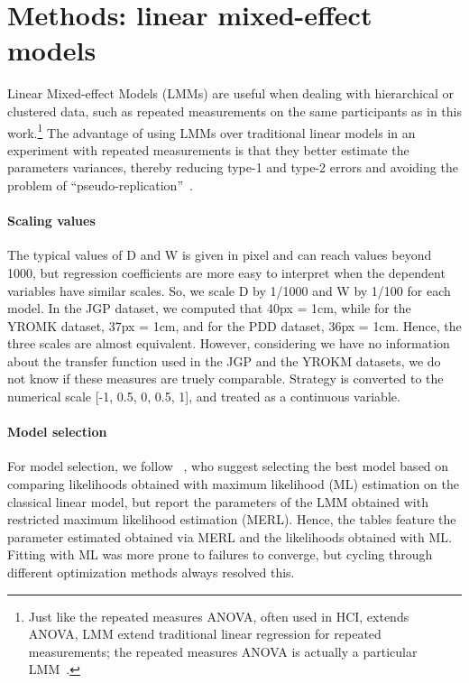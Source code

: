 \documentclass[acmlarge, manuscript,review]{acmart}
\begin{document}
\section{Methods: linear mixed-effect models\label{app:lmm}}
Linear Mixed-effect Models (LMMs) are useful when dealing with hierarchical or clustered data, such as repeated measurements on the same participants as in this work\cite{harrison2018}.\footnote{Just like the repeated measures ANOVA, often used in HCI, extends ANOVA, LMM extend traditional linear regression for repeated measurements; the repeated measures ANOVA is actually a particular LMM~\cite{murrar2018}.}
The advantage of using LMMs over traditional linear models in an experiment with repeated measurements is that they better estimate the parameters variances, thereby reducing type-1 and type-2 errors and avoiding the problem of ``pseudo-replication''~\cite{harrison2018}. 


\paragraph{Scaling values}
The typical values of D and W is given in pixel and can reach values beyond 1000, but regression coefficients are more easy to interpret when the dependent variables have similar scales. So, we scale D by 1/1000 and W by 1/100 for each model. In the JGP dataset, we computed that 40px = 1cm, while for the YROMK dataset, 37px = 1cm, and for the PDD dataset, 36px = 1cm. Hence, the three scales are almost equivalent. However, considering we have no information about the transfer function used in the JGP and the YROKM datasets, we do not know if these measures are truely comparable.
Strategy is converted to the numerical scale [-1, 0.5, 0, 0.5, 1], and treated as a continuous variable. 

\paragraph{Model selection}
For model selection, we follow \citeauthor{zuur2009}~\cite{zuur2009}, who suggest selecting the best model based on comparing likelihoods obtained with maximum likelihood (ML) estimation on the classical linear model, but report the parameters of the LMM obtained with restricted maximum likelihood estimation (MERL). Hence, the tables feature the parameter estimated obtained via MERL and the likelihoods obtained with ML. Fitting with ML was more prone to failures to converge, but cycling through different optimization methods always resolved this.
\end{document}
